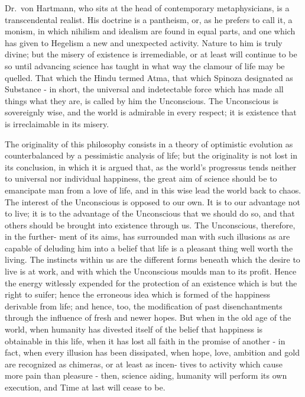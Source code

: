 \documentclass[]{book}
\begin{document}
Dr.~von Hartmann, who sits at the head of contemporary metaphysicians,
is a transcendental realist. His doctrine is a pantheism, or, as he
prefers to call it, a monism, in which nihilism and idealism are found
in equal parts, and one which has given to Hegelism a new and unexpected
activity. Nature to him is truly divine; but the misery of existence is
irremediable, or at least will continue to be so until advancing science
has taught in what way the clamour of life may be quelled. That which
the Hindu termed Atma, that which Spinoza designated as Substance - in
short, the universal and indetectable force which has made all things
what they are, is called by him the Unconscious. The Unconscious is
sovereignly wise, and the world is admirable in every respect; it is
existence that is irreclaimable in its misery.

The originality of this philosophy consists in a theory of optimistic
evolution as counterbalanced by a pessimistic analysis of life; but the
originality is not lost in its conclusion, in which it is argued that,
as the world's progressus tends neither to universal nor individual
happiness, the great aim of science should be to emancipate man from a
love of life, and in this wise lead the world back to chaos. The
interest of the Unconscious is opposed to our own. It is to our
advantage not to live; it is to the advantage of the Unconscious that we
should do so, and that others should be brought into existence through
us. The Unconscious, therefore, in the further- ment of its aims, has
surrounded man with such illusions as are capable of deluding him into a
belief that life is a pleasant thing well worth the living. The
instincts within us are the different forms beneath which the desire to
live is at work, and with which the Unconscious moulds man to its
profit. Hence the energy witlessly expended for the protection of an
existence which is but the right to suifer; hence the erroneous idea
which is formed of the happiness derivable from life; and hence, too,
the modification of past disenchantments through the influence of fresh
and newer hopes. But when in the old age of the world, when humanity has
divested itself of the belief that happiness is obtainable in this life,
when it has lost all faith in the promise of another - in fact, when
every illusion has been dissipated, when hope, love, ambition and gold
are recognized as chimeras, or at least as incen- tives to activity
which cause more pain than pleasure - then, science aiding, humanity
will perform its own execution, and Time at last will cease to be.
\end{document}
